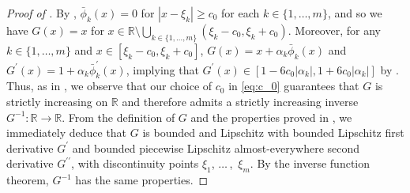 \documentclass[onseside, final]{amsart}
\theoremstyle{definition}
\newcommand{\R}{\mathbb R}
\newcommand{\continuityset}{\R \setminus \bigcup_{k \in \{1, \dotsc, m\}}(\xi_k - c_0, \xi_k + c_0)}
\numberwithin{equation}{section}
\begin{document}
	\begin{proof}[Proof of ]
		By , $\bar \phi_k (x) = 0$ for $|x - \xi_k| \geq c_0$ for each $k \in \{1, \dotsc, m\}$, and so we have $G(x) = x$ for $x \in \continuityset$. Moreover, for any $k \in \{1, \dotsc, m\}$ and $x \in [\xi_k - c_0, \xi_k + c_0]$, $G(x) = x + \alpha_k \bar \phi_k(x)$ and $G^\prime(x) = 1 + \alpha_k \bar \phi_k^\prime(x)$, implying that $G^\prime(x) \in [1 - 6 c_0 |\alpha_k|, 1 + 6 c_0 |\alpha_k|]$ by . Thus, as in \cite[Lemma 2.2]{LeSz17}, we observe that our choice of $c_0$ in \eqref{eq:c_0} guarantees that $G$ is strictly increasing on $\R$ and therefore admits a strictly increasing inverse $G^{-1} \colon \R \to \R$. From the definition of $G$ and the properties proved in , we immediately deduce that $G$ is bounded and Lipschitz with bounded Lipschitz first derivative $G^\prime$ and bounded piecewise Lipschitz almost-everywhere second derivative $G^{\prime \prime}$, with discontinuity points $\xi_1$, $\dotsc\,$,~$\xi_m$. By the inverse function theorem, $G^{-1}$ has the same properties.
	\end{proof}
		
\end{document}
